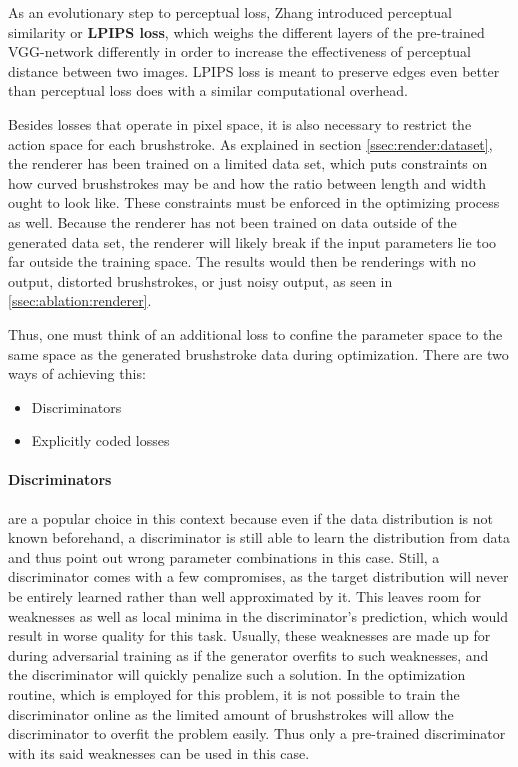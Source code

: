 As an evolutionary step to perceptual loss, Zhang \etal \cite{lpips} introduced perceptual similarity or \textbf{LPIPS loss}, which weighs the different layers of the pre-trained VGG-network differently in order to increase the effectiveness of perceptual distance between two images.
LPIPS loss is meant to preserve edges even better than perceptual loss does with a similar computational overhead.

Besides losses that operate in pixel space, it is also necessary to restrict the action space for each brushstroke.
As explained in section \ref{ssec:render:dataset}, the renderer has been trained on a limited data set, which puts constraints on how curved brushstrokes may be and how the ratio between length and width ought to look like.
These constraints must be enforced in the optimizing process as well.
Because the renderer has not been trained on data outside of the generated data set, the renderer will likely break if the input parameters lie too far outside the training space.
The results would then be renderings with no output, distorted brushstrokes, or just noisy output, as seen in \ref{ssec:ablation:renderer}.

Thus, one must think of an additional loss to confine the parameter space to the same space as the generated brushstroke data during optimization.
There are two ways of achieving this:
\begin{itemize}
    \item Discriminators
    \item Explicitly coded losses
\end{itemize}

\paragraph{Discriminators} are a popular choice in this context because even if the data distribution is not known beforehand, a discriminator is still able to learn the distribution from data and thus point out wrong parameter combinations in this case.
Still, a discriminator comes with a few compromises, as the target distribution will never be entirely learned rather than well approximated by it.
This leaves room for weaknesses as well as local minima in the discriminator's prediction, which would result in worse quality for this task.
Usually, these weaknesses are made up for during adversarial training as if the generator overfits to such weaknesses, and the discriminator will quickly penalize such a solution.
In the optimization routine, which is employed for this problem, it is not possible to train the discriminator online as the limited amount of brushstrokes will allow the discriminator to overfit the problem easily.
Thus only a pre-trained discriminator with its said weaknesses can be used in this case.

